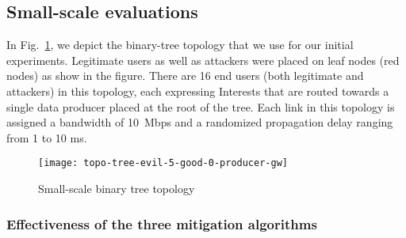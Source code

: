 \subsection{Small-scale evaluations}
\label{sec:small-scale}

In Fig.~\ref{fig:small-scale}, we depict the binary-tree topology that we use for our initial experiments.
Legitimate users as well as attackers were placed on leaf nodes (red nodes) as show in the figure. There are 16 end users (both legitimate and attackers) in this topology, each expressing Interests that are routed towards a single data producer placed at the root of the tree.  Each link in this topology is assigned a bandwidth of 10~Mbps and a randomized propagation delay ranging from 1 to 10 ms. 


\begin{figure}[]
  \centering
  \texttt{[image: topo-tree-evil-5-good-0-producer-gw]}
  \caption{Small-scale binary tree topology}
  \label{fig:small-scale}
\end{figure}


\subsubsection{Effectiveness of the three mitigation algorithms}


